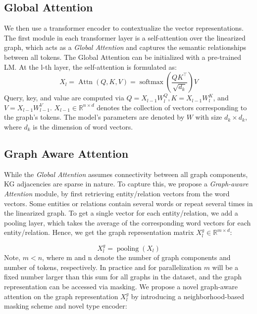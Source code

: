 \documentclass[11pt]{article}
\begin{document}
\subsection{Global Attention}
We then use a transformer encoder to contextualize the vector representations. The first module in each transformer layer is a self-attention over the linearized graph, which acts as a \textit{Global Attention} and captures the semantic relationships between all tokens. The Global Attention can be initialized with a pre-trained LM. At the l-th layer, the self-attention is formulated as:
\begin{equation}
    X_l = \operatorname{Attn}(Q, K, V)=\operatorname{softmax}\left(\frac{Q K^{\top}}{\sqrt{d_{k}}}\right) V
\end{equation}
Query, key, and value are computed via $Q = X_{l-1} W_l^Q, K=X_{l-1} W_l^K$, and $V= X_{l-1} W_{l-1}^V$. $X_{l-1} \in \mathbb{R}^{n\times d}$ denotes the collection of vectors corresponding to the graph's tokens. The model's parameters are denoted by $W$ with size ${d_k \times d_k}$, where $d_k$ is the dimension of word vectors. 

\subsection{Graph Aware Attention}
While the \textit{Global Attention} assumes connectivity between all graph components, KG adjacencies are sparse in nature. To capture this, we propose a \textit{Graph-aware Attention} module, by first retrieving entity/relation vectors from the word vectors. Some entities or relations contain several words or repeat several times in the linearized graph. To get a single vector for each entity/relation, we add a pooling layer, which takes the average of the corresponding word vectors for each entity/relation. Hence, we get the graph representation matrix $X_l^g \in \mathbb{R}^{m \times d}$:

\begin{equation}
    X_l^g = \operatorname{pooling}(X_l)
\end{equation}
Note, $m < n$, where m and n denote the number of graph components and number of tokens, respectively. In practice and for parallelization $m$ will be a fixed number larger than this sum for all graphs in the dataset, and the graph representation can be accessed via masking. We propose a novel graph-aware attention on the graph representation $X_l^g$ by introducing a neighborhood-based masking scheme and novel type encoder:
\end{document}
